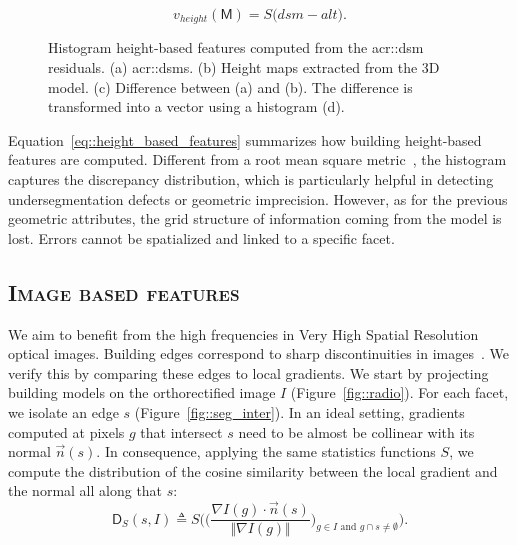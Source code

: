         \begin{equation}
            \label{eq::height_based_features}
            v_{height}(\mathsf{M}) = S\big( dsm - alt \big).
        \end{equation}
        \begin{figure}[H]
            
            \caption{
                \label{fig::height_based_features}
                Histogram height-based features computed from the \gls{acr::dsm} residuals.
                (a) \glspl{acr::dsm}.
                (b) Height maps extracted from the 3D model.
                (c) Difference between (a) and (b).
                The difference is transformed into a vector using a histogram (d).
            }
        \end{figure}
        Equation~\ref{eq::height_based_features} summarizes how building height-based features are computed. Different from a root mean square metric~\parencite{lafarge2012creating,Poullis2013}, the histogram captures the discrepancy distribution, which is particularly helpful in detecting undersegmentation defects or geometric imprecision. However, as for the previous geometric attributes, the grid structure of information coming from the model is lost. Errors cannot be spatialized and linked to a specific facet.

    \subsection{\textsc{Image based features}}
        We aim to benefit from the high frequencies in Very High Spatial Resolution optical images. Building edges correspond to sharp discontinuities in images~\parencite{ortner2007building}. We verify this by comparing these edges to local gradients. We start by projecting building models on the orthorectified image $I$ (Figure~\ref{fig::radio}). For each facet, we isolate an edge $s$ (Figure~\ref{fig::seg_inter}). In an ideal setting, gradients computed at pixels $g$ that intersect $s$ need to be almost be collinear with its normal $\vec{n}(s)$. In consequence, applying the same statistics functions $S$, we compute the distribution of the cosine similarity between the local gradient and the normal all along that $s$:
        \begin{equation}
            \label{eq::corr_seg}
            \mathsf{D}_S(s, I) \triangleq S \bigg( \Big(\frac{\nabla I(g) \cdot \vec{n}(s)}{\Vert \nabla I(g)\Vert}\Big)_{g \in I \textrm{ and } g \cap s \neq \emptyset} \bigg).
        \end{equation}

